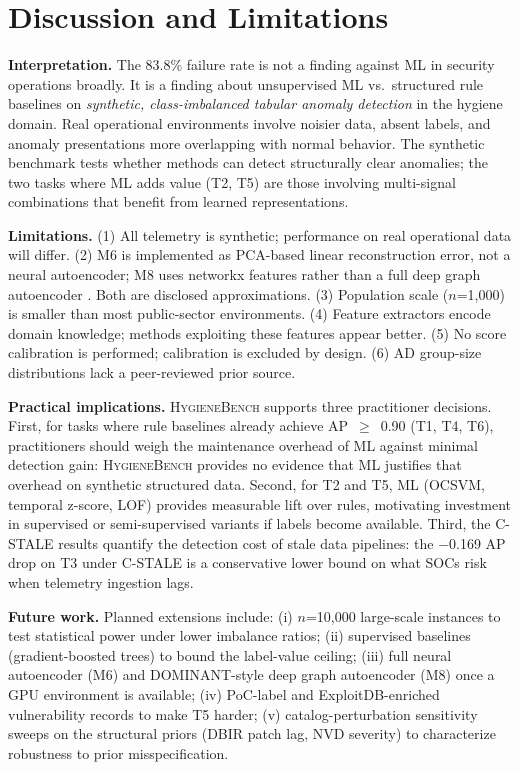 \documentclass[conference]{IEEEtran}
\newcommand{\hb}{\textsc{HygieneBench}\xspace}
\begin{document}
\section{Discussion and Limitations}
\label{sec:discussion}

\textbf{Interpretation.} The 83.8\% failure rate is not a finding against ML in
security operations broadly. It is a finding about unsupervised ML vs.\ structured
rule baselines on \emph{synthetic, class-imbalanced tabular anomaly detection} in
the hygiene domain. Real operational environments involve noisier data, absent
labels, and anomaly presentations more overlapping with normal behavior. The
synthetic benchmark tests whether methods can detect structurally clear anomalies;
the two tasks where ML adds value (T2, T5) are those involving multi-signal
combinations that benefit from learned representations.

\textbf{Limitations.} (1) All telemetry is synthetic; performance on real
operational data will differ. (2) M6 is implemented as PCA-based linear
reconstruction error, not a neural autoencoder; M8 uses networkx features rather
than a full deep graph autoencoder \cite{ding2019dominant}. Both are disclosed
approximations. (3) Population scale ($n$=1,000) is smaller than most public-sector
environments. (4) Feature extractors encode domain knowledge; methods exploiting
these features appear better. (5) No score calibration is performed; calibration is
excluded by design. (6) AD group-size distributions lack a peer-reviewed prior source.

\textbf{Practical implications.}
\hb supports three practitioner decisions. First, for tasks where rule baselines
already achieve AP~$\geq$~0.90 (T1, T4, T6), practitioners should weigh the
maintenance overhead of ML against minimal detection gain: \hb provides no evidence
that ML justifies that overhead on synthetic structured data. Second, for T2 and T5,
ML (OCSVM, temporal z-score, LOF) provides measurable lift over rules, motivating
investment in supervised or semi-supervised variants if labels become available.
Third, the C-STALE results quantify the detection cost of stale data pipelines: the
$-$0.169 AP drop on T3 under C-STALE is a conservative lower bound on what SOCs risk
when telemetry ingestion lags.

\textbf{Future work.}
Planned extensions include: (i) $n$=10,000 large-scale instances to test statistical
power under lower imbalance ratios; (ii) supervised baselines (gradient-boosted
trees) to bound the label-value ceiling; (iii) full neural autoencoder (M6) and
DOMINANT-style deep graph autoencoder (M8) once a GPU environment is available;
(iv) PoC-label and ExploitDB-enriched vulnerability records to make T5 harder;
(v) catalog-perturbation sensitivity sweeps on the structural priors (DBIR patch lag,
NVD severity) to characterize robustness to prior misspecification.
\end{document}

